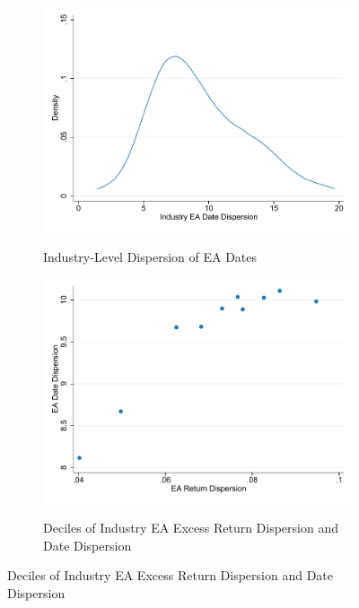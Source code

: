 \begin{figure}[ht]
    \begin{center}
    \caption{Industry-Level Dispersion of EA Dates and Excess Returns} \label{fig:Industry}
    \begin{subfigure}[t]{0.8\textwidth}
        \caption{Industry-Level Dispersion of EA Dates}
        \centering
        \includegraphics[width=\linewidth]{Figures/Industry EA Dispersion.pdf}  \label{fig:Industry_Date_Dispersion}
    \end{subfigure}
    \hfill
    \begin{subfigure}[t]{0.8\textwidth}
        \caption{Deciles of Industry EA Excess Return Dispersion and Date Dispersion}
    \centering
        \includegraphics[width=\linewidth]{Figures/Industry EA Date and Return Dispersion.pdf}  \label{fig:Industry_Date_Ret}
    \end{subfigure}
    \end{center}
\end{figure}




